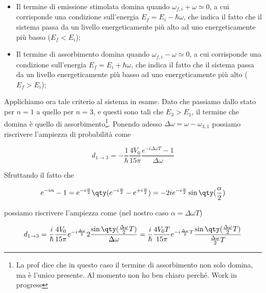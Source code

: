 \begin{soluzione}
   \begin{itemize}[leftmargin=0.5cm]
      \item Il termine di emissione stimolata domina quando $\omega_{f,i} + \omega \simeq0$, a cui corrisponde una condizione sull'energia $E_f=E_i - \hbar \omega$, che indica il fatto che il sistema passa da un livello energeticamente più alto ad uno energeticamente più basso ($E_f < E_i$);
      \item Il termine di assorbimento domina quando $\omega_{f,i} - \omega \simeq0$, a cui corrisponde una condizione sull'energia $E_f=E_i + \hbar \omega$, che indica il fatto che il sistema passa da un livello energeticamente più basso ad uno energeticamente più alto ($E_f > E_i$);
   \end{itemize}

   Applichiamo ora tale criterio al sistema in esame. Dato che passiamo dallo stato per $n=1$ a quello per $n=3$, e questi sono tali che $E_3 > E_1$, il termine che domina è quello di assorbimento\footnote{La prof dice che in questo caso il termine di assorbimento non solo domina, ma è l'unico presente. Al momento non ho ben chiaro perché. Work in progress}. Ponendo adesso $\Delta \omega=\omega - \omega_{3,1}$ possiamo riscrivere l'ampiezza di probabilità come

   \begin{equation*}
      d_{1 \to 3}
      =-\frac{1}{\hbar} \frac{4 V_0}{15 \pi} \frac{e^{-i \Delta \omega T} - 1}{\Delta \omega}
   \end{equation*}

   Sfruttando il fatto che
   
   \begin{equation*}
      e^{-i\alpha} - 1
      =e^{-i\frac{\alpha}{2}} \qty( e^{-i\frac{\alpha}{2}} - e^{+i\frac{\alpha}{2}} )
      =-2i e^{-i\frac{\alpha}{2}} \sin{\qty( \frac{\alpha}{2} )}
   \end{equation*}

   possiamo riscrivere l'ampiezza come (nel nostro caso $\alpha=\Delta\omega T$)

   \begin{equation*}
      d_{1 \to 3}
      =\frac{i}{\hbar} \frac{4 V_0}{15 \pi} e^{-i \frac{\Delta \omega}{2} } 2 \frac{ \sin{ \qty( \frac{\Delta \omega}{2} T ) } }{ \Delta \omega }
      =\frac{i}{\hbar} \frac{4 V_0 T}{15 \pi} e^{-i \frac{\Delta \omega}{2} T} \frac{ \sin{ \qty( \frac{\Delta \omega}{2} T ) } }{\frac{\Delta \omega}{2} T}
   \end{equation*}
   

\end{soluzione}
